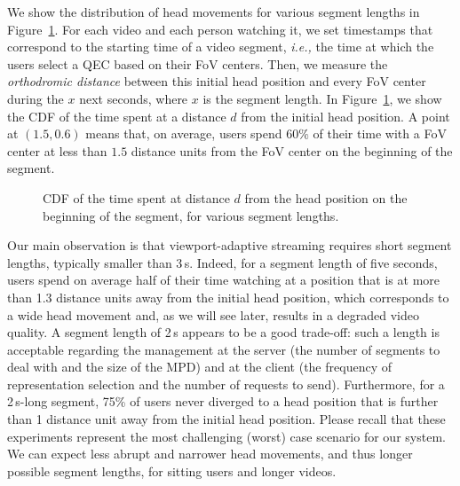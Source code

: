 We show the distribution of head movements for various segment lengths in Figure~\ref{cdf-dataset}.
For each video
and each person watching it, we set timestamps that correspond to the starting time of a video segment,
\textit{i.e.,} the time at which the users select a QEC based on their FoV centers.
Then, we measure the \emph{orthodromic distance} between this initial head position and every FoV center
during the $x$ next seconds, where $x$ is the segment length. In Figure~\ref{cdf-dataset}, we show the \ac{CDF} of the time spent at a distance
$d$ from the initial head position. A point at $(1.5,0.6)$ means that, on average, users spend $60\%$ of
their time with a FoV center at less than $1.5$ distance units from the FoV center on the beginning of the segment.

\begin{figure}[htbp]
\centering

\caption{CDF of the time spent at distance $d$ from the head position on the beginning of the
segment, for various segment lengths.}\label{cdf-dataset}
\end{figure}

Our main observation is that viewport-adaptive streaming requires short segment lengths, typically
smaller than 3\,s. Indeed, for a segment length of five seconds,
users spend on average half of their time watching at a position that is at more than
1.3 distance units away from the initial head position,
which corresponds to a wide head movement and, as we will see later, results in a degraded video quality.
A segment length of 2\,s appears to be a good trade-off: such a length is acceptable regarding the
management at the server (the number of segments to deal with and the size of the \ac{MPD})
and at the client (the frequency of representation selection and the number of requests
to send). Furthermore, for a 2\,s-long segment, 75\% of users never diverged to
a head position that is further than 1 distance unit away from the initial head position. Please recall that these experiments represent the most challenging (worst) case scenario for our system.
We can expect less abrupt and narrower head movements, and thus longer possible segment lengths, for sitting
users and longer videos.
